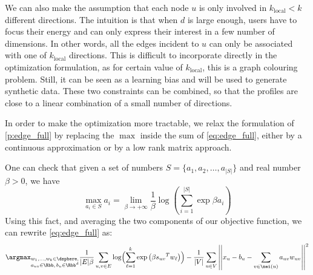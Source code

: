 We can also make the assumption that each node $u$ is only involved in $k_\mathrm{local} < k$
different directions. The intuition is that when $d$ is large enough, users have to focus their
energy and can only express their interest in a few number of dimensions. In other words, all the
edges incident to $u$ can only be associated with one of $k_\mathrm{local}$ directions. This is
difficult to incorporate directly in the optimization formulation, as for certain value of
$k_\mathrm{local}$, this is a \NPc{} graph colouring problem. Still, it can be seen as a learning
bias and will be used to generate synthetic data.
These two constraints can be combined, so that the profiles are close to a linear combination of a
small number of directions.


\bigskip

In order to make the optimization more tractable, we relax the formulation of \autoref{p:edge_full}
by replacing the $\max$ inside the sum of \eqref{eq:edge_full}, either by a continuous approximation
or by a low rank matrix approach.

One can check that given a set of numbers $S=\{a_1, a_2, \ldots, a_{|S|}\}$ and real number $\beta >
0$, we have
\begin{equation*}
  \max_{a_i \in S} a_i = \lim_{\beta \rightarrow + \infty} \frac{1}{\beta}
  \log\left( \sum_{i=1}^{|S|} \exp{\beta a_i} \right)
\end{equation*}
Using this fact, and averaging the two components of our objective function, we can rewrite
\eqref{eq:edge_full} as:
\begin{equation}
  \label{eq:edge_soft}
  \argmax_{{\substack{w_1,\ldots,w_k \in \dsphere,\\
  a_{uv}\in\Rbb,\, b_u \in \Rbb^d}}}
  \frac{1}{|E|\beta} \sum_{u,v\in E}
  \log\Bigl(\sum_{\ell=1}^k\exp\left(\beta {s_{uv}}^T w_\ell \right)\Bigr)
  - \frac{1}{|V|}\sum_{u\in V}
  \left|\left| x_u - b_u - \sum_{v \in \nei(u)} a_{uv} w_{uv} \right|\right|^2
\end{equation}


